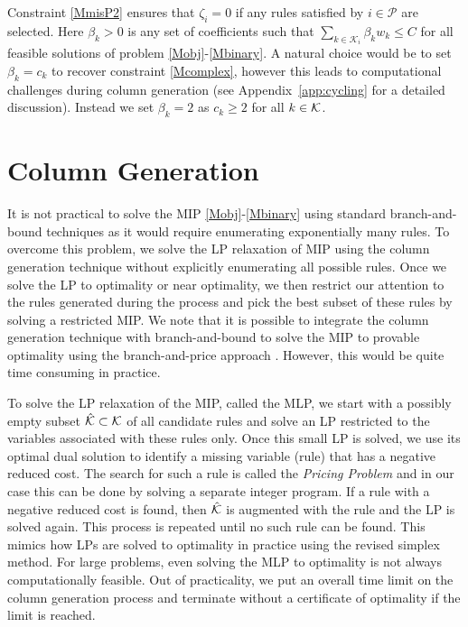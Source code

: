 \documentclass[twoside,11pt]{article}
\begin{document}
Constraint \eqref{MmisP2} ensures that $\zeta_i = 0$ if any rules satisfied by $i \in \mathcal{P}$ are selected. Here $\beta_k > 0$ is any set of coefficients such that $\sum_{k \in \mathcal{K}_i} \beta_k w_k \leq C$ for all feasible solutions of problem \eqref{Mobj}-\eqref{Mbinary}. A natural choice would be to set $\beta_k = c_k$ to recover constraint \eqref{Mcomplex}, however this leads to computational challenges during column generation (see Appendix~\ref{app:cycling} for a detailed discussion). Instead we set $\beta_k = 2$ as  $c_k\ge2$ for all $k\in\mathcal{K}$. 


\section{Column Generation}\label{sec:cg}

It is not practical to solve the MIP \eqref{Mobj}-\eqref{Mbinary} using standard branch-and-bound techniques	\citep{LandDoig} as it would require enumerating exponentially many rules. To overcome this problem, we solve the LP relaxation of MIP using the column generation technique \citep{GilmoreGomory,IPref} without explicitly enumerating all possible rules. 
Once we solve the LP to optimality or near optimality, we then restrict our attention to the rules generated during the process and pick the best subset of these rules by  solving a restricted MIP. We note that it is possible to integrate the column generation technique with branch-and-bound to solve the MIP to provable optimality using the branch-and-price approach \citep{Nemhauser:1998}. However, this would be quite time consuming in practice. 

To solve the LP relaxation of the MIP, called the MLP, we start with a possibly empty subset $\hat{\mathcal{K}}\subset\mathcal{K}$ of all candidate rules and solve an LP restricted to the variables associated with these rules only. Once this small LP is solved, we use its optimal dual solution to identify a missing variable (rule) that has a negative reduced cost. The search for such a rule is called the {\em Pricing Problem} and in our case this can be done by solving a separate integer program.
If a rule with a negative reduced cost is found, then  $\hat {\mathcal{K}}$ is augmented with the rule and the LP is solved again. This process is repeated until no such rule can be found. This mimics how LPs are solved to optimality in practice using the revised simplex method. For large problems, even solving the MLP to optimality is not always computationally feasible. Out of practicality, we put an overall time limit on the column generation process and terminate without a certificate of optimality if the limit is reached. 
\end{document}
